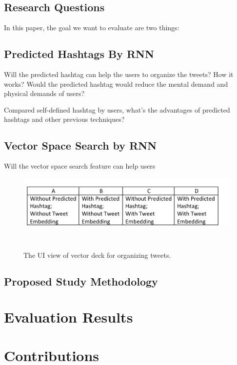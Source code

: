 \subsection{Research Questions}

In this paper, the goal we want to evaluate are two things:

\subsection{Predicted Hashtags By RNN}

Will the predicted hashtag can help the users to organize the tweets? How it works? Would the predicted hashtag would reduce the mental demand and physical demands of users?

Compared self-defined hashtag by users, what's the advantages of predicted hashtags and other previous techniques?


\subsection{Vector Space Search by RNN}

Will the vector space search feature can help users 

\begin{figure}[thb!]
    \includegraphics[width= 1.1 \columnwidth]{images/user_study_plan}
   \caption{The UI view of vector deck for organizing tweets.  } ~\label{fig: vector_deck}
\end{figure}


\subsection{Proposed Study Methodology}



\section{Evaluation Results}


\section{Contributions}


